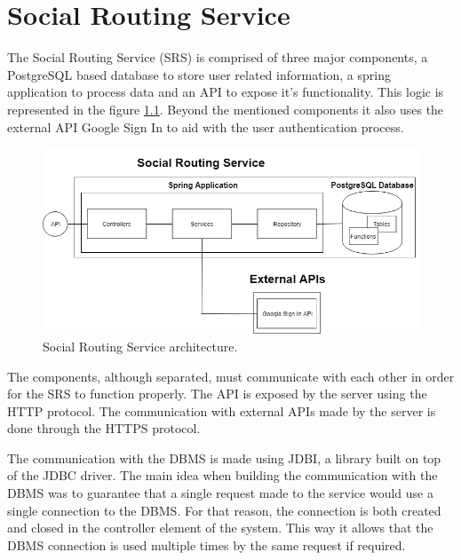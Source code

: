 \chapter{Social Routing Service}

The Social Routing Service (SRS) is comprised of three major components, 
a PostgreSQL based database to store user related information, a spring application to process data and an API to expose it's functionality.
This logic is represented in the figure \ref{fig:socialroutingservice}. Beyond the mentioned
components it also uses the external API Google Sign In to aid with the user authentication process.

\begin{figure}[ht]            
    \includegraphics[width=\textwidth]{images/project-structure/service-structure2.PNG}
    \caption{Social Routing Service architecture.}
    \label{fig:socialroutingservice}
\end{figure}  

The components, although separated, must communicate with each other in order for the SRS
to function properly. The API is exposed by the server using the HTTP protocol. The 
communication with external APIs made by the server is done through the HTTPS\cite{https} 
protocol.

The communication with the DBMS is made using JDBI\cite{jdbidocs}, a library built on top
of the JDBC\cite{jdbcdocs} driver. The main idea when building the communication with the DBMS
was to guarantee that a single request made to the service would use a single connection 
to the DBMS. For that reason, the connection is both created and closed in the controller
element of the system. This way it allows that the DBMS connection is used multiple times
by the same request if required.
\newpage

